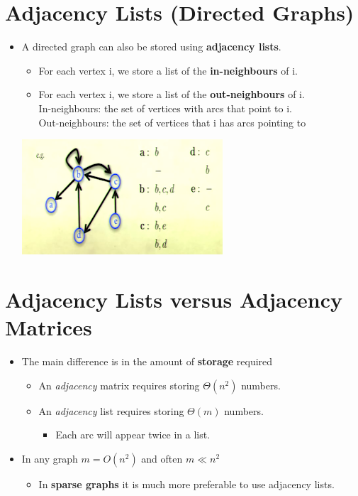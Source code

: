 \documentclass[12pt]{article}
\begin{document}
\section{Adjacency Lists (Directed Graphs)}
\renewcommand{\labelitemii}{$\circ$}
\renewcommand{\labelitemiii}{$\cdot$}
\renewcommand{\labelitemiii}{$\rightarrow$}
\renewcommand{\labelitemiv}{$\star$}
\begin{itemize}
\item A directed graph can also be stored using \textbf{adjacency lists}.
	\begin{itemize}
	\item For each vertex i, we store a list of the \textbf{in-neighbours} of i.
	\item For each vertex i, we store a list of the \textbf{out-neighbours} of i.\\
	In-neighbours: the set of vertices with arcs that point to i.\\
	Out-neighbours: the set of vertices that i has arcs pointing to
	\end{itemize}
	\begin{center}
	\includegraphics{lecture76}
	\end{center}
\end{itemize}




\section{Adjacency Lists versus Adjacency Matrices}
\renewcommand{\labelitemii}{$\circ$}
\renewcommand{\labelitemiii}{$\cdot$}
\renewcommand{\labelitemiii}{$\rightarrow$}
\renewcommand{\labelitemiv}{$\star$}
\begin{itemize}
\item The main difference is in the amount of \textbf{storage} required
	\begin{itemize}
	\item An \textit{adjacency} matrix requires storing $\Theta(n^2)$ numbers.
	\item An \textit{adjacency} list requires storing $\Theta(m)$ numbers.
		\begin{itemize}
		\item Each arc will appear twice in a list. 
		\end{itemize}
	\end{itemize}
\item In any graph $m = O(n^2)$ and often $m \ll n^2$
	\begin{itemize}
	\item In \textbf{sparse graphs} it is much more preferable to use adjacency lists.
	\end{itemize}
\end{itemize}
\end{document}
